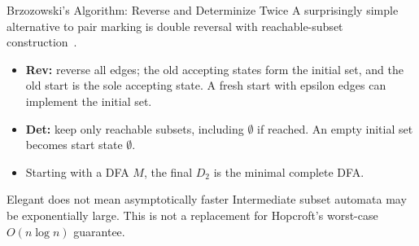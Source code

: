 \documentclass[10pt]{beamer}
\begin{document}
\begin{frame}{Brzozowski's Algorithm: Reverse and Determinize Twice}
  \small
  A surprisingly simple alternative to pair marking is double reversal
  with reachable-subset construction~\cite{brzozowski-duality}.
  \begin{center}
  \end{center}
  \pause
  \begin{itemize}
    \item \textbf{Rev:} reverse all edges; the old accepting states form the
      initial set, and the old start is the sole accepting state.
      A fresh start with epsilon edges can implement the initial set.
    \item \textbf{Det:} keep only reachable subsets, including $\emptyset$
      if reached. An empty initial set becomes start state $\emptyset$.
    \item Starting with a DFA $M$, the final $D_2$ is the minimal complete DFA.
  \end{itemize}
  \begin{alertblock}{Elegant does not mean asymptotically faster}
    Intermediate subset automata may be exponentially large. This is not
    a replacement for Hopcroft's worst-case $O(n\log n)$ guarantee.
  \end{alertblock}
\end{frame}
\end{document}
